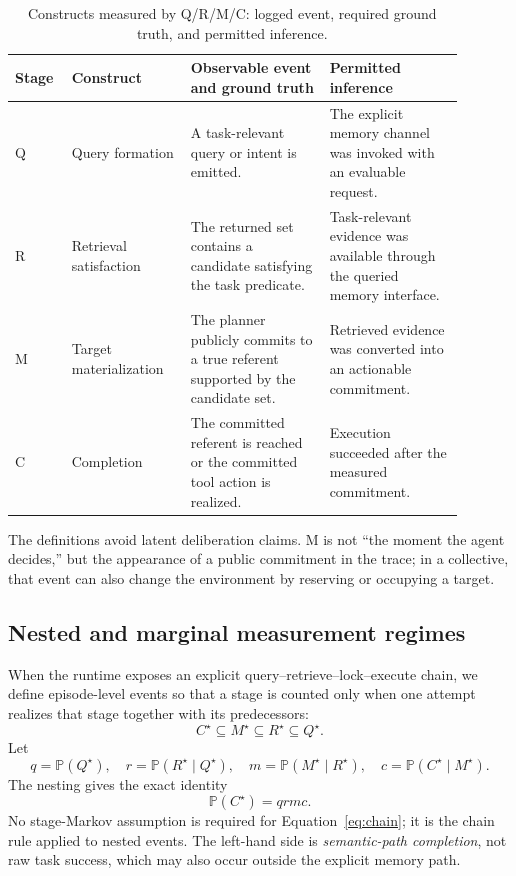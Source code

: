 \documentclass{article}
\newcommand{\qrmc}{Q/R/M/C}
\newcommand{\Qstar}{Q^{\star}}
\newcommand{\Rstar}{R^{\star}}
\newcommand{\Mstar}{M^{\star}}
\newcommand{\Cstar}{C^{\star}}
\newcommand{\Prob}{\mathbb{P}}
\begin{document}
\begin{table}[t]
\caption{Constructs measured by \qrmc{}: logged event, required ground truth, and permitted inference.}
\label{tab:constructs}
\centering
\scriptsize
\setlength{\tabcolsep}{4pt}
\renewcommand{\arraystretch}{0.94}
\begin{tabular}{p{0.09\linewidth}p{0.24\linewidth}p{0.29\linewidth}p{0.27\linewidth}}
\toprule
Stage & Construct & Observable event and ground truth & Permitted inference \\
\midrule
Q & Query formation & A task-relevant query or intent is emitted. & The explicit memory channel was invoked with an evaluable request. \\
R & Retrieval satisfaction & The returned set contains a candidate satisfying the task predicate. & Task-relevant evidence was available through the queried memory interface. \\
M & Target materialization & The planner publicly commits to a true referent supported by the candidate set. & Retrieved evidence was converted into an actionable commitment. \\
C & Completion & The committed referent is reached or the committed tool action is realized. & Execution succeeded after the measured commitment. \\
\bottomrule
\end{tabular}
\end{table}

The definitions avoid latent deliberation claims. M is not ``the moment the agent decides,'' but the appearance of a public commitment in the trace; in a collective, that event can also change the environment by reserving or occupying a target.

\subsection{Nested and marginal measurement regimes}

When the runtime exposes an explicit query--retrieve--lock--execute chain, we define episode-level events so that a stage is counted only when one attempt realizes that stage together with its predecessors:
\begin{equation}
  \Cstar \subseteq \Mstar \subseteq \Rstar \subseteq \Qstar.
  \label{eq:nesting}
\end{equation}
Let
\begin{equation}
q=\Prob(\Qstar),\quad
r=\Prob(\Rstar\mid\Qstar),\quad
m=\Prob(\Mstar\mid\Rstar),\quad
c=\Prob(\Cstar\mid\Mstar).
\label{eq:rates}
\end{equation}
The nesting gives the exact identity
\begin{equation}
  \Prob(\Cstar)=qrmc.
  \label{eq:chain}
\end{equation}
No stage-Markov assumption is required for Equation~\ref{eq:chain}; it is the chain rule applied to nested events. The left-hand side is \emph{semantic-path completion}, not raw task success, which may also occur outside the explicit memory path.
\end{document}
